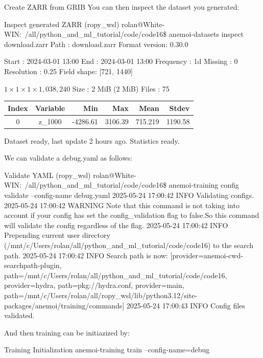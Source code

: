 \begin{codeonly}{Create ZARR from GRIB}
You can then inspect the dataset you generated: 
\begin{codeonly}{Inspect generated ZARR}
(ropy_wsl) rolan@White-WIN:~/all/python_and_ml_tutorial/code/code16\$ anemoi-datasets inspect download.zarr
Path          : download.zarr
Format version: 0.30.0

Start      : 2024-03-01 13:00
End        : 2024-03-01 13:00
Frequency  : 1d
Missing    : 0
Resolution : 0.25
Field shape: [721, 1440]

$1 \times 1 \times 1 \times 1,038,240$
Size       : 2 MiB (2 MiB)
Files      : 75
\begin{tabular}{|c|c|r|r|r|r|}
\hline
\textbf{Index} & \textbf{Variable} & \textbf{Min} & \textbf{Max} & \textbf{Mean} & \textbf{Stdev} \\
\hline
0 & z\_1000 & -4286.61 & 3106.39 & 715.219 & 1190.58 \\
\hline
\end{tabular}
Dataset ready, last update 2 hours ago.
Statistics ready.
\end{codeonly}

We can validate a debug.yaml as follows: 

\begin{codeonly}{Validate YAML}
(ropy_wsl) rolan@White-WIN:~/all/python_and_ml_tutorial/code/code16\$ anemoi-training config validate --config-name debug.yaml
2025-05-24 17:00:42 INFO Validating configs.
2025-05-24 17:00:42 WARNING Note that this command is not taking into account if your config has set                     the config_validation flag to false.So this command will validate the config regardless of the flag.
2025-05-24 17:00:42 INFO Prepending current user directory (/mnt/c/Users/rolan/all/python_and_ml_tutorial/code/code16) to the search path.
2025-05-24 17:00:42 INFO Search path is now: [provider=anemoi-cwd-searchpath-plugin, path=/mnt/c/Users/rolan/all/python_and_ml_tutorial/code/code16, provider=hydra, path=pkg://hydra.conf, provider=main, path=/mnt/c/Users/rolan/all/ropy_wsl/lib/python3.12/site-packages/anemoi/training/commands]
2025-05-24 17:00:43 INFO Config files validated.
\end{codeonly}

And then training can be initiazized by: 

\begin{codeonly}{Training Initialization}
anemoi-training train --config-name=debug
\end{codeonly}





\end{codeonly}
